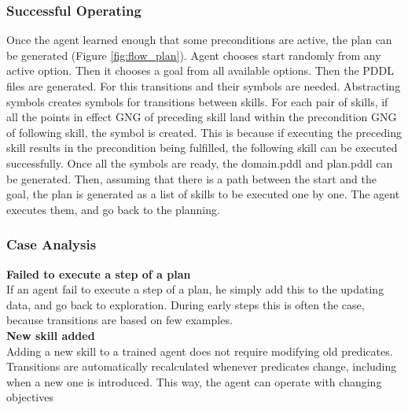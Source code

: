 \subsubsection*{Successful Operating}
Once the agent learned enough that some preconditions are active, the plan can be generated (Figure \ref{fig:flow_plan}). Agent chooses start randomly from any active option. Then it chooses a goal from all available options. Then the PDDL files are generated. For this transitions and their symbols are needed. Abstracting symbols creates symbols for transitions between skills. For each pair of skills, if all the points in effect GNG of preceding skill land within the precondition GNG of following skill, the symbol is created. This is because if executing the preceding skill results in the precondition being fulfilled, the following skill can be executed successfully.  Once all the symbols are ready, the domain.pddl and plan.pddl can be generated. Then, assuming that there is a path between the start and the goal, the plan is generated as a list of skills to be executed one by one. The agent executes them, and go back to the planning.

\subsubsection*{Case Analysis}
\textbf{Failed to execute a step of a plan}\\
If an agent fail to execute a step of a plan, he simply add this to the updating data, and go back to exploration. During early steps this is often the case, because transitions are based on few examples. \\
\textbf{New skill added} \\
Adding a new skill to a trained agent does not require modifying old predicates. Transitions are automatically recalculated whenever predicates change, including when a new one is introduced. This way, the agent can operate with changing objectives\\
